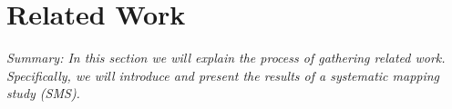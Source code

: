 \iffalse  \fi
\chapter{Related Work}
\textit{Summary: In this section we will explain the process of gathering related work. Specifically, we will introduce and present the results of a systematic mapping study (SMS). }


